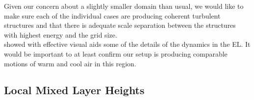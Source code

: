 Given our concern about a slightly smaller domain than usual, we would like to make sure each of the individual cases are producing coherent turbulent structures and that there is adequate scale separation between the structures with highest energy and the grid size.\\

\citeauthor{SullMoengStev} \cite{SullMoengStev} showed with effective visual aids some of the details of the dynamics in the \acs{EL}.  It would be important to at least confirm our setup is producing comparable motions of warm and cool air in this region.\\  


\subsection{Local Mixed Layer Heights}

